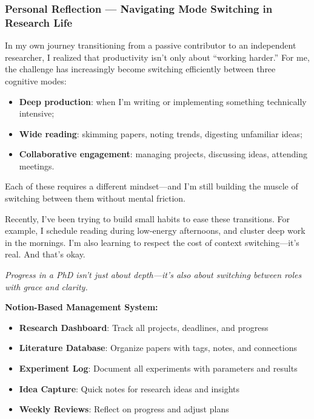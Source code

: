 \documentclass[11pt,a4paper]{article}
\begin{document}
\subsubsection{Personal Reflection — Navigating Mode Switching in Research Life}

\begin{tcolorbox}[colback=purple!5,colframe=royalpurple,title=\faBrain~Personal Reflection — Navigating Mode Switching in Research Life]
In my own journey transitioning from a passive contributor to an independent researcher, I realized that productivity isn't only about ``working harder.'' For me, the challenge has increasingly become switching efficiently between three cognitive modes:

\begin{itemize}
    \item \textbf{Deep production}: when I'm writing or implementing something technically intensive;
    \item \textbf{Wide reading}: skimming papers, noting trends, digesting unfamiliar ideas;
    \item \textbf{Collaborative engagement}: managing projects, discussing ideas, attending meetings.
\end{itemize}

Each of these requires a different mindset—and I'm still building the muscle of switching between them without mental friction.

Recently, I've been trying to build small habits to ease these transitions. For example, I schedule reading during low-energy afternoons, and cluster deep work in the mornings. I'm also learning to respect the cost of context switching—it's real. And that's okay.

\textit{Progress in a PhD isn't just about depth—it's also about switching between roles with grace and clarity.}
\end{tcolorbox}

\textbf{Notion-Based Management System:}
\begin{itemize}
    \item \textbf{Research Dashboard}: Track all projects, deadlines, and progress
    \item \textbf{Literature Database}: Organize papers with tags, notes, and connections
    \item \textbf{Experiment Log}: Document all experiments with parameters and results
    \item \textbf{Idea Capture}: Quick notes for research ideas and insights
    \item \textbf{Weekly Reviews}: Reflect on progress and adjust plans
\end{itemize}
\end{document}
